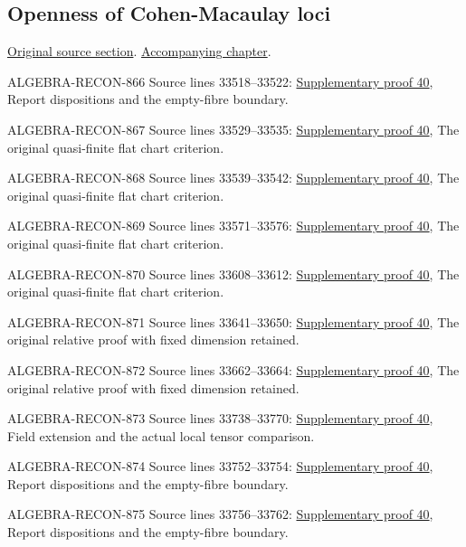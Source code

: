 \subsection{Openness of Cohen-Macaulay loci}
\hypertarget{algebra-source-section-CM-open}{}
\noindent\href{https://github.com/stacks/stacks-project/blob/a04446e57ec1fbc252a871afcec7752fb2807b14/algebra.tex\#L33515}{Original source section}. \href{algebra.pdf\#nameddest=section-CM-open}{Accompanying chapter}.

\begin{AlgebraSourceRoutes}
\item[ALGEBRA-RECON-866] Source lines 33518--33522: \hyperlink{algebra_cm_open_notes_20260928}{Supplementary proof 40}, Report dispositions and the empty-fibre boundary.
\item[ALGEBRA-RECON-867] Source lines 33529--33535: \hyperlink{algebra_cm_open_notes_20260928}{Supplementary proof 40}, The original quasi-finite flat chart criterion.
\item[ALGEBRA-RECON-868] Source lines 33539--33542: \hyperlink{algebra_cm_open_notes_20260928}{Supplementary proof 40}, The original quasi-finite flat chart criterion.
\item[ALGEBRA-RECON-869] Source lines 33571--33576: \hyperlink{algebra_cm_open_notes_20260928}{Supplementary proof 40}, The original quasi-finite flat chart criterion.
\item[ALGEBRA-RECON-870] Source lines 33608--33612: \hyperlink{algebra_cm_open_notes_20260928}{Supplementary proof 40}, The original quasi-finite flat chart criterion.
\item[ALGEBRA-RECON-871] Source lines 33641--33650: \hyperlink{algebra_cm_open_notes_20260928}{Supplementary proof 40}, The original relative proof with fixed dimension retained.
\item[ALGEBRA-RECON-872] Source lines 33662--33664: \hyperlink{algebra_cm_open_notes_20260928}{Supplementary proof 40}, The original relative proof with fixed dimension retained.
\item[ALGEBRA-RECON-873] Source lines 33738--33770: \hyperlink{algebra_cm_open_notes_20260928}{Supplementary proof 40}, Field extension and the actual local tensor comparison.
\item[ALGEBRA-RECON-874] Source lines 33752--33754: \hyperlink{algebra_cm_open_notes_20260928}{Supplementary proof 40}, Report dispositions and the empty-fibre boundary.
\item[ALGEBRA-RECON-875] Source lines 33756--33762: \hyperlink{algebra_cm_open_notes_20260928}{Supplementary proof 40}, Report dispositions and the empty-fibre boundary.

\end{AlgebraSourceRoutes}
